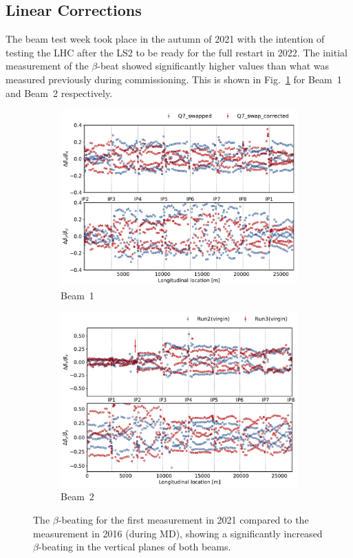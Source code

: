\documentclass{cernatsnote}
\begin{document}
\subsection{Linear Corrections}
The beam test week took place in the autumn of 2021 with the intention of testing the LHC after the LS2 to be ready for the full restart in 2022.
The initial measurement of the $\beta$-beat showed significantly higher values than what was measured previously during commissioning. This is shown in Fig.~\ref{fig:initalVs2016} for Beam~1 and Beam~2 respectively.  


\begin{figure}[ht]
\begin{subfigure}{.5\textwidth}
  \centering
  \includegraphics[width=.98\linewidth]{inj_linear/beamtest/beam1/beta_beat_before_after_swap.pdf}  
  \caption{Beam~1}
\end{subfigure}
\begin{subfigure}{.5\textwidth}
  \centering
  \includegraphics[width=.98\linewidth]{inj_linear/beamtest/beam2/B2_BetaBeat_2016_vs_first2021.pdf}  
  \caption{Beam~2}
\end{subfigure}
\caption{The $\beta$-beating for the first measurement in 2021 compared to the measurement in 2016 (during MD), showing a significantly increased $\beta$-beating in the vertical planes of both beams.}
\label{fig:initalVs2016}
\end{figure}
\end{document}
